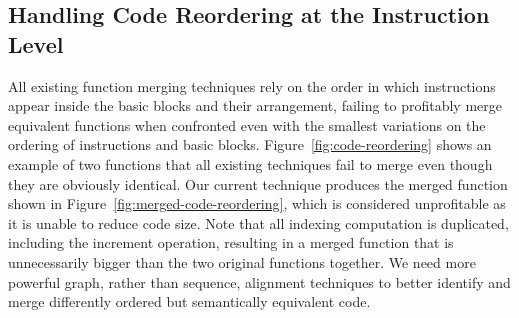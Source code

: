 


\subsection{Handling Code Reordering at the Instruction Level}

All existing function merging techniques rely on the order in which instructions appear inside the basic blocks and their arrangement,
failing to profitably merge equivalent functions when confronted even with the smallest variations on the ordering of instructions and basic blocks.
Figure~\ref{fig:code-reordering} shows an example of two functions that all existing techniques fail to merge even though they are obviously identical.
Our current technique produces the merged function shown in Figure~\ref{fig:merged-code-reordering}, which is considered unprofitable as it is unable to reduce code size.
Note that all indexing computation is duplicated, including the increment operation, resulting in a merged function that is unnecessarily bigger than the two original functions together.
We need more powerful graph, rather than sequence, alignment techniques to better identify and merge differently ordered but semantically equivalent code.

